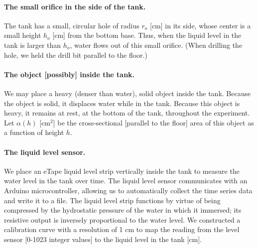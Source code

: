 \documentclass[openacc]{rsproca_new}%
\begin{document}
\paragraph{The small orifice in the side of the tank.} The tank has a small, circular hole of radius $r_o$ [cm] in its side, whose center is a small height $h_o$ [cm] from the bottom base.
Thus, when the liquid level in the tank is larger than $h_o$, water flows out of this small orifice.
(When drilling the hole, we held the drill bit parallel to the floor.) 

\paragraph{The object [possibly] inside the tank.} We may place a heavy (denser than water), solid object inside the tank. Because the object is solid, it displaces water while in the tank. Because this object is heavy, it remains at rest, at the bottom of the tank, throughout the experiment. Let $\alpha(h)$ [cm$^2$] be the cross-sectional [parallel to the floor] area of this object as a function of height $h$.

\paragraph{The liquid level sensor.} We place an eTape\texttrademark\xspace liquid level strip vertically inside the tank to measure the water level in the tank over time. The liquid level sensor communicates with an Arduino microcontroller, allowing us to automatically collect the time series data and write it to a file. The liquid level strip functions by virtue of being compressed by the hydrostatic pressure of the water in which it immersed; its resistive output is inversely proportional to the water level. 
\cite{eTape}
We constructed a calibration curve with a resolution of 1 cm to map the reading from the level sensor [0-1023 integer values] to the liquid level in the tank [cm]. 
\end{document}
